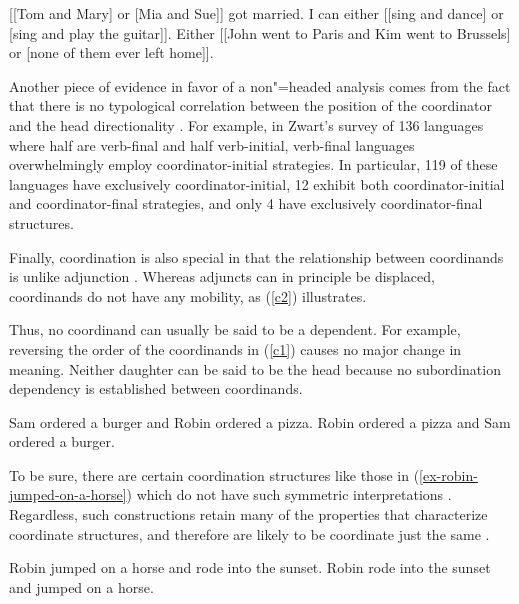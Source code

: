 \eal
\ex {}[[Tom and Mary] or [Mia and Sue]] got married.
\ex I can either [[sing and dance] or [sing and play the guitar]].
\ex Either [[John went to Paris and Kim went to Brussels] or [none of them ever left home]].
\zl

Another piece of evidence in favor of a non"=headed analysis comes from the fact that there is no typological correlation between the position of the coordinator and the head directionality \citep{zwart}. For example, in Zwart's  survey of 136 languages where half are verb-final and half
verb-initial,  verb-final languages overwhelmingly employ coordinator-initial strategies.
In particular, 119 of these languages have exclusively coordinator-initial, 12 exhibit both coordinator-initial
and coordinator-final strategies, and only 4 have exclusively coordinator-final structures. 


Finally, coordination is also special in that the relationship between coordinands is unlike
adjunction \citep[--160]{levinepostal}.
Whereas adjuncts can in principle be displaced, coordinands do not have any mobility, as (\ref{c2}) illustrates.

\eal
\label{c2}
\zl


\noindent
Thus, no coordinand can usually be said to be a dependent. For example,  reversing the order of the coordinands in (\ref{c1}) causes no major change in meaning. Neither daughter can be said to be the head because no subordination dependency is established between coordinands.

\eal
\label{c1}
\ex Sam ordered a burger and Robin ordered a pizza.
\ex Robin ordered a pizza and Sam ordered a burger.
\zl

\noindent
To be sure, there are certain coordination structures like those in
(\ref{ex-robin-jumped-on-a-horse}) which do not have such symmetric 
interpretations \citep{goldsmith,lakoff86,levinprince86}.
Regardless, such constructions retain many of the properties that characterize coordinate structures, and therefore are likely to be
coordinate just the same \citep[Chapter~5]{kehler}.

\eal
\label{ex-robin-jumped-on-a-horse}
\ex Robin jumped on a horse and rode into the sunset.
\ex Robin rode into the sunset and jumped on a horse.
\zl

